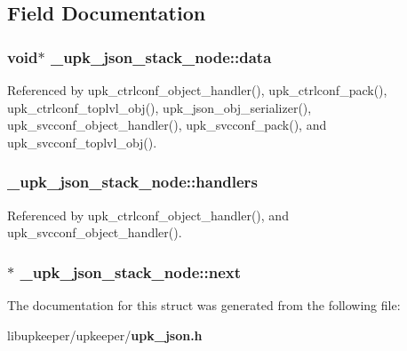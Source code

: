 \subsection{Field Documentation}
\subsubsection[{data}]{\setlength{\rightskip}{0pt plus 5cm}void$\ast$ {\bf \_\-upk\_\-json\_\-stack\_\-node::data}}\label{struct__upk__json__stack__node_a5f78b744ac28571069914673a0869033}


Referenced by upk\_\-ctrlconf\_\-object\_\-handler(), upk\_\-ctrlconf\_\-pack(), upk\_\-ctrlconf\_\-toplvl\_\-obj(), upk\_\-json\_\-obj\_\-serializer(), upk\_\-svcconf\_\-object\_\-handler(), upk\_\-svcconf\_\-pack(), and upk\_\-svcconf\_\-toplvl\_\-obj().

\subsubsection[{handlers}]{ {\bf \_\-upk\_\-json\_\-stack\_\-node::handlers}}\label{struct__upk__json__stack__node_ad22f4491f9086f1ccbd6696dd73736cf}


Referenced by upk\_\-ctrlconf\_\-object\_\-handler(), and upk\_\-svcconf\_\-object\_\-handler().

\subsubsection[{next}]{$\ast$ {\bf \_\-upk\_\-json\_\-stack\_\-node::next}}\label{struct__upk__json__stack__node_a3f4755d75ac7758d6b3ac8f782a1ab16}


The documentation for this struct was generated from the following file:\begin{DoxyCompactItemize}
\item 
libupkeeper/upkeeper/{\bf upk\_\-json.h}\end{DoxyCompactItemize}

